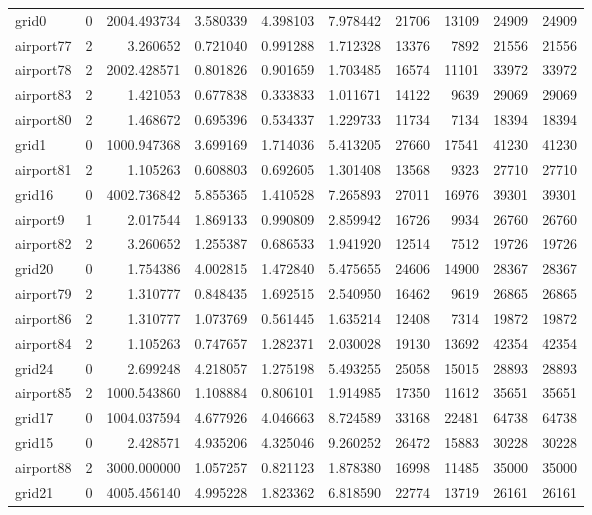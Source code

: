 \begin{longtable}{|l|r|r|r|r|r|r|r|r|r|}
grid0 & 0 & 2004.493734 & 3.580339 & 4.398103 & 7.978442 & 21706 & 13109 & 24909 & 24909 \\
airport77 & 2 & 3.260652 & 0.721040 & 0.991288 & 1.712328 & 13376 & 7892 & 21556 & 21556 \\
airport78 & 2 & 2002.428571 & 0.801826 & 0.901659 & 1.703485 & 16574 & 11101 & 33972 & 33972 \\
airport83 & 2 & 1.421053 & 0.677838 & 0.333833 & 1.011671 & 14122 & 9639 & 29069 & 29069 \\
airport80 & 2 & 1.468672 & 0.695396 & 0.534337 & 1.229733 & 11734 & 7134 & 18394 & 18394 \\
grid1 & 0 & 1000.947368 & 3.699169 & 1.714036 & 5.413205 & 27660 & 17541 & 41230 & 41230 \\
airport81 & 2 & 1.105263 & 0.608803 & 0.692605 & 1.301408 & 13568 & 9323 & 27710 & 27710 \\
grid16 & 0 & 4002.736842 & 5.855365 & 1.410528 & 7.265893 & 27011 & 16976 & 39301 & 39301 \\
airport9 & 1 & 2.017544 & 1.869133 & 0.990809 & 2.859942 & 16726 & 9934 & 26760 & 26760 \\
airport82 & 2 & 3.260652 & 1.255387 & 0.686533 & 1.941920 & 12514 & 7512 & 19726 & 19726 \\
grid20 & 0 & 1.754386 & 4.002815 & 1.472840 & 5.475655 & 24606 & 14900 & 28367 & 28367 \\
airport79 & 2 & 1.310777 & 0.848435 & 1.692515 & 2.540950 & 16462 & 9619 & 26865 & 26865 \\
airport86 & 2 & 1.310777 & 1.073769 & 0.561445 & 1.635214 & 12408 & 7314 & 19872 & 19872 \\
airport84 & 2 & 1.105263 & 0.747657 & 1.282371 & 2.030028 & 19130 & 13692 & 42354 & 42354 \\
grid24 & 0 & 2.699248 & 4.218057 & 1.275198 & 5.493255 & 25058 & 15015 & 28893 & 28893 \\
airport85 & 2 & 1000.543860 & 1.108884 & 0.806101 & 1.914985 & 17350 & 11612 & 35651 & 35651 \\
grid17 & 0 & 1004.037594 & 4.677926 & 4.046663 & 8.724589 & 33168 & 22481 & 64738 & 64738 \\
grid15 & 0 & 2.428571 & 4.935206 & 4.325046 & 9.260252 & 26472 & 15883 & 30228 & 30228 \\
airport88 & 2 & 3000.000000 & 1.057257 & 0.821123 & 1.878380 & 16998 & 11485 & 35000 & 35000 \\
grid21 & 0 & 4005.456140 & 4.995228 & 1.823362 & 6.818590 & 22774 & 13719 & 26161 & 26161 \\

\end{longtable}
